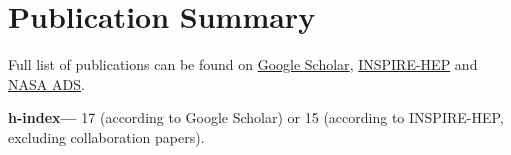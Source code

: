 \section{Publication Summary}

Full list of publications can be found on
\href{https://scholar.google.com/citations?hl=en&user=jET8KxgAAAAJ}%
{Google Scholar},
\href{https://inspirehep.net/authors/1798261}%
{INSPIRE-HEP}
and
\href{https://ui.adsabs.harvard.edu/user/libraries/SDMGXaKoRomaOJsefpo2yQ}%
{NASA ADS}.

\textbf{h-index---}%
17 (according to Google Scholar) or 15 (according to INSPIRE-HEP, excluding collaboration papers).
